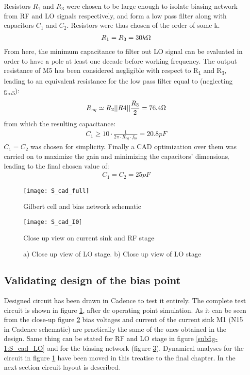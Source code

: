 Resistors \(R_1\) and \(R_3\) were chosen to be large enough to isolate biasing network from RF and LO signals respectively, and form a low pass filter along with capacitors \(C_1\) and \(C_2\). Resistors were thus chosen of the order of some k\ohm.
\begin{align}
	R_1=R_3=30k\ohm \nonumber
\end{align}
From here, the minimum capacitance to filter out LO signal can be evaluated in order to have a pole at least one decade before working frequency. The output resistance of M5 has been considered negligible with respect to R\textsubscript{1} and R\textsubscript{3}, leading to an equivalent resistance for the low pass filter equal to (neglecting g\textsubscript{m5}):
\begin{align}
	R_{eq}\simeq R_2||R4||\frac{R_3}{2}=76.4 \ohm \nonumber
\end{align}
from which the resulting capacitance:
\begin{align}
	C_1\ge 10\cdot \frac{1}{2\pi \cdot R_{eq} \cdot f_{lo }} =20.8pF
\end{align}
\(C_1 = C_2\) was chosen for simplicity. Finally a CAD optimization over them was carried on to maximize the gain and minimizing the capacitors' dimensions, leading to the final chosen value of:
\begin{align}
	C_1=C_2=25pF
\end{align}

\begin{figure}[H]
	\centering
	\texttt{[image: S\_cad\_full]}
	\caption{Gilbert cell and bias network schematic}
	\label{S_cad_full}
\end{figure}
\begin{figure}[H]
	\centering
	\texttt{[image: S\_cad\_I0]}
	\caption{Close up view on current sink and RF stage}
	\label{S_cad_I0}
\end{figure}
\begin{figure}[H]
	\centering
	\hfill
	\caption{a) Close up view of LO stage\label{subfig-1:S_cad_LO}. b) Close up view of LO stage\label{subfig-1:S_cad_biasnet} }
\end{figure}

\subsection{Validating design of the bias point}
Designed circuit has been drawn in Cadence to test it entirely. The complete test circuit is shown in figure \ref{S_cad_full}, after dc operating point simulation.
As it can be seen from the close-up figure \ref{S_cad_I0} bias voltages and current of the current sink M1 (N15 in Cadence schematic) are practically the same of the ones obtained in the design. Same thing can be stated for RF and LO stage in figure \ref{subfig-1:S_cad_LO} and for the biasing network (figure \ref{subfig-1:S_cad_biasnet}).
Dynamical analyses for the circuit in figure \ref{S_cad_full} have been moved in this treatise to the final chapter. In the next section circuit layout is described. 